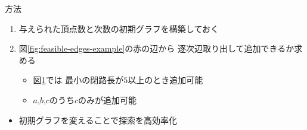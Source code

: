 \begin{frame}{方法}
  \begin{enumerate}
  \item 与えられた頂点数と次数の初期グラフを構築しておく
  \item 図\ref{fig:feasible-edges-example}の赤の辺から
    逐次辺取り出して追加できるか求める
    \begin{itemize}
    \item 図\ref{fig:feasible-edges-example2}では
      最小の閉路長が$5$以上のとき追加可能
    \item $a$,$b$,$c$のうち$c$のみが追加可能
    \end{itemize}
  \end{enumerate}
  \begin{itemize}
  \item 初期グラフを変えることで探索を高効率化
  \end{itemize}
  \begin{figure}
    \centering
    \begin{minipage}{.4\columnwidth}
      \def\svgwidth{\textwidth}
      
      \label{fig:feasible-edges-example}
    \end{minipage}
    \hspace{1em}
    \begin{minipage}{.4\columnwidth}
      \def\svgwidth{\textwidth}
      
      \label{fig:feasible-edges-example2}
    \end{minipage}
  \end{figure}
\end{frame}

